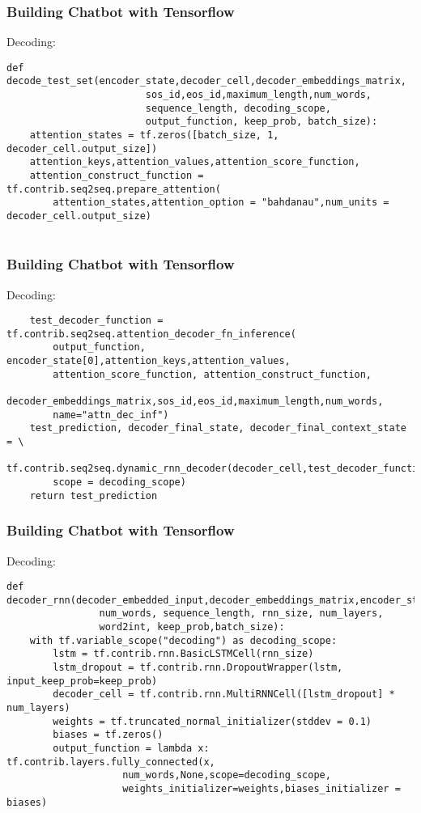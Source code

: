 \begin{frame}[fragile]\frametitle{Building Chatbot with Tensorflow}
Decoding:
\begin{lstlisting}
def decode_test_set(encoder_state,decoder_cell,decoder_embeddings_matrix,
                        sos_id,eos_id,maximum_length,num_words,
                        sequence_length, decoding_scope, 
                        output_function, keep_prob, batch_size):
    attention_states = tf.zeros([batch_size, 1, decoder_cell.output_size])
    attention_keys,attention_values,attention_score_function, 
    attention_construct_function = tf.contrib.seq2seq.prepare_attention(
        attention_states,attention_option = "bahdanau",num_units = decoder_cell.output_size)
                             
\end{lstlisting}

\end{frame}

\begin{frame}[fragile]\frametitle{Building Chatbot with Tensorflow}
Decoding:
\begin{lstlisting}
    test_decoder_function = tf.contrib.seq2seq.attention_decoder_fn_inference(
        output_function, encoder_state[0],attention_keys,attention_values,
        attention_score_function, attention_construct_function,
        decoder_embeddings_matrix,sos_id,eos_id,maximum_length,num_words, 
        name="attn_dec_inf")
    test_prediction, decoder_final_state, decoder_final_context_state = \
    tf.contrib.seq2seq.dynamic_rnn_decoder(decoder_cell,test_decoder_function,
        scope = decoding_scope)
    return test_prediction                                                     
\end{lstlisting}

\end{frame}

\begin{frame}[fragile]\frametitle{Building Chatbot with Tensorflow}
Decoding:
\begin{lstlisting}
def decoder_rnn(decoder_embedded_input,decoder_embeddings_matrix,encoder_state,
                num_words, sequence_length, rnn_size, num_layers, 
                word2int, keep_prob,batch_size):
    with tf.variable_scope("decoding") as decoding_scope:
        lstm = tf.contrib.rnn.BasicLSTMCell(rnn_size)
        lstm_dropout = tf.contrib.rnn.DropoutWrapper(lstm, input_keep_prob=keep_prob)
        decoder_cell = tf.contrib.rnn.MultiRNNCell([lstm_dropout] * num_layers)
        weights = tf.truncated_normal_initializer(stddev = 0.1)
        biases = tf.zeros()
        output_function = lambda x: tf.contrib.layers.fully_connected(x,
                    num_words,None,scope=decoding_scope,
                    weights_initializer=weights,biases_initializer = biases)                                                  
\end{lstlisting}

\end{frame}

